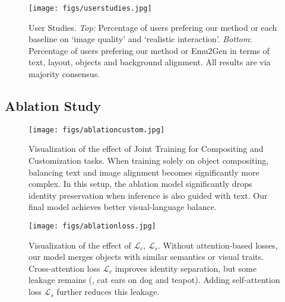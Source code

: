 \begin{figure}[t]
    \centering
    \texttt{[image: figs/userstudies.jpg]}
    \caption{User Studies. \textit{Top:} Percentage of users prefering our method or each baseline \cite{chen2023anydoor,zhang2023controlcom,song2024imprint,yang2023paintbyexample,tarres2024thinking} on `image quality' and `realistic interaction'. \textit{Bottom}: Percentage of users prefering our method or Emu2Gen \cite{sun2024emugen} in terms of text, layout, objects and background alignment. All results are via majority consensus.} %

    \label{fig:userstudies}
    \vspace{-4mm}
\end{figure}

\subsection{Ablation Study}


\begin{figure}[t]
    \centering
    \texttt{[image: figs/ablationcustom.jpg]}
    \caption{Visualization of the effect of Joint Training for Compositing and Customization tasks. When training solely on object compositing, balancing text and image alignment becomes significantly more complex. In this setup, the ablation model significantly drops identity preservation when inference is also guided with text. Our final model achieves better visual-language balance. }

    \label{fig:ablationcustom}
    \vspace{-6mm}
\end{figure}

\begin{figure}[t]
    \centering
    \texttt{[image: figs/ablationloss.jpg]}
    \caption{Visualization of the effect of $\mathcal{L}_c$, $\mathcal{L}_s$. Without attention-based losses, our model merges objects with similar semantics or visual traits. Cross-attention loss $\mathcal{L}_c$ improves identity separation, but some leakage remains (\eg, cat ears on dog and teapot). Adding self-attention loss $\mathcal{L}_s$ further reduces this leakage.} %

    \label{fig:ablationloss}
    \vspace{-2mm}
\end{figure}




